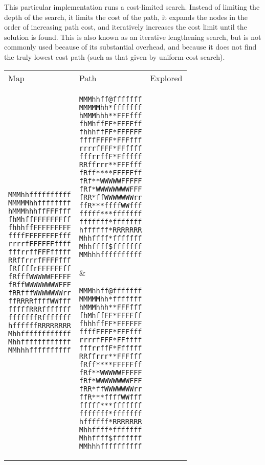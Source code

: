 \documentclass[12pt, article]{scrartcl}
\begin{document}
This particular implementation runs a cost-limited search. Instead of limiting the depth of the search, it limits the cost of the path, it expands the nodes in the order of increasing path cost, and iteratively increases the cost limit until the solution is found. This is also known as an iterative lengthening search, but is not commonly used because of its substantial overhead, and because it does not find the truly lowest cost path (such as that given by uniform-cost search). \\
\begin{tabular}{p{2in} p{2in} p{2in}}
Map & Path & Explored \\

\begin{verbatim}
MMMhhffffffffff
MMMMMhhffffffff
hMMMhhhffFFFfff
fhMhffFFFFFFFff
fhhhffFFFFFFFFF
ffffFFFFFFFFfff
rrrrfFFFFFFffff
fffrrffFFFfffff
RRffrrrfFFFFfff
fRffffrFFFFFFff
fRfffWWWWWFFFFF
fRffWWWWWWWWFFF
fRRfffWWWWWWWrr
ffRRRRffffWWfff
fffffRRRfffffff
fffffffRfffffff
hffffffRRRRRRRR
Mhhffffffffffff
Mhhffffffffffff
MMhhhffffffffff
\end{verbatim}
&
\begin{verbatim}
MMMhhff@fffffff
MMMMMhh*fffffff
hMMMhhh**FFFfff
fhMhffFF*FFFFff
fhhhffFF*FFFFFF
ffffFFFF*FFFfff
rrrrfFFF*FFffff
fffrrffF*Ffffff
RRffrrr**FFFfff
fRff****FFFFFff
fRf**WWWWWFFFFF
fRf*WWWWWWWWFFF
fRR*ffWWWWWWWrr
ffR***ffffWWfff
fffff***fffffff
fffffff*fffffff
hffffff*RRRRRRR
Mhhffff*fffffff
Mhhffff$fffffff
MMhhhffffffffff
\end{verbatim}
&
\begin{verbatim}
MMMhhff@fffffff
MMMMMhh*fffffff
hMMMhhh**FFFfff
fhMhffFF*FFFFff
fhhhffFF*FFFFFF
ffffFFFF*FFFfff
rrrrfFFF*FFffff
fffrrffF*Ffffff
RRffrrr**FFFfff
fRff****FFFFFff
fRf**WWWWWFFFFF
fRf*WWWWWWWWFFF
fRR*ffWWWWWWWrr
ffR***ffffWWfff
fffff***fffffff
fffffff*fffffff
hffffff*RRRRRRR
Mhhffff*fffffff
Mhhffff$fffffff
MMhhhffffffffff
\end{verbatim}
\end{tabular}


\end{document}
